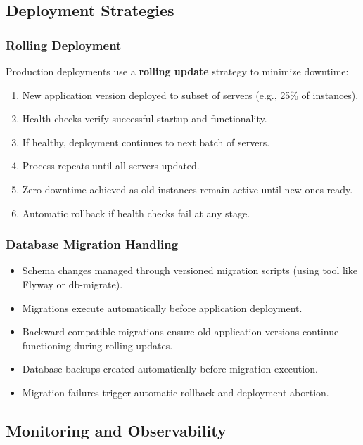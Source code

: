 \documentclass[12pt,a4paper]{article}
\begin{document}
\subsection{Deployment Strategies}

\subsubsection{Rolling Deployment}

Production deployments use a \textbf{rolling update} strategy to minimize downtime:

\begin{enumerate}[leftmargin=2em, itemsep=6pt]
    \item New application version deployed to subset of servers (e.g., 25\% of instances).
    \item Health checks verify successful startup and functionality.
    \item If healthy, deployment continues to next batch of servers.
    \item Process repeats until all servers updated.
    \item Zero downtime achieved as old instances remain active until new ones ready.
    \item Automatic rollback if health checks fail at any stage.
\end{enumerate}

\subsubsection{Database Migration Handling}

\begin{itemize}[leftmargin=2em, itemsep=6pt]
    \item Schema changes managed through versioned migration scripts (using tool like Flyway or db-migrate).
    \item Migrations execute automatically before application deployment.
    \item Backward-compatible migrations ensure old application versions continue functioning during rolling updates.
    \item Database backups created automatically before migration execution.
    \item Migration failures trigger automatic rollback and deployment abortion.
\end{itemize}

\subsection{Monitoring and Observability}
\end{document}
